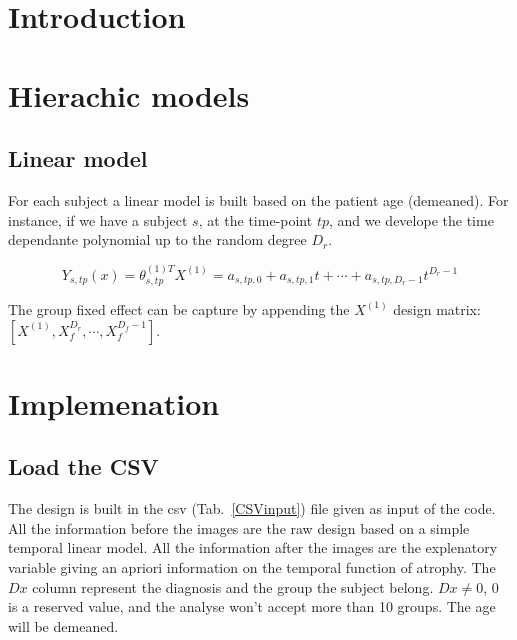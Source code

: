 \documentclass[final, paper=letter,5p,times,twocolumn]{elsarticle}
\theoremstyle{definition}
\begin{document}
\section{Introduction}


\section{Hierachic models}

\subsection{Linear model}

For each subject a linear model is built based on the patient age (demeaned). For instance, if we have a subject $s$, at the time-point $tp$, and we develope the time dependante polynomial up to the random degree $D_{r}$.

$$
Y_{s,tp}(x) = \theta_{s,tp}^{(1)T} X^{(1)} =  a_{s,tp,0} + a_{s,tp,1} t + \cdots + a_{s,tp,D_{r} - 1}t^{D_{r} - 1}
$$

The group fixed effect can be capture by appending the $X^{(1)}$ design matrix: $[X^{(1)}, X_{f}^{D_{r}}, \cdots, X_{f}^{D_{f} - 1}]$.


\section{Implemenation}

\subsection{Load the CSV}

The design is built in the csv (Tab.~\ref{CSVinput}) file given as input of the code. All the information before the images are the raw design based on a simple temporal linear model. All the information after the images are the explenatory variable giving an apriori information on the temporal function of atrophy. The $Dx$ column represent the diagnosis and the group the subject belong. $Dx \ne 0$, 0 is a reserved value, and the analyse won't accept more than 10 groups. The age will be demeaned.
\end{document}

